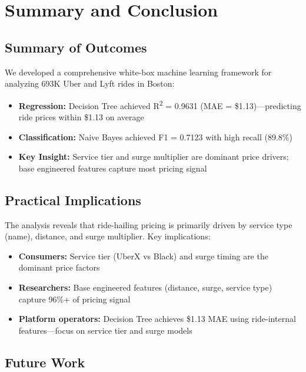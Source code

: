 \documentclass[12pt,a4paper]{article}
\begin{document}
\section{Summary and Conclusion}

\subsection{Summary of Outcomes}

We developed a comprehensive white-box machine learning framework for analyzing 693K Uber and Lyft rides in Boston:

\begin{itemize}
    \item \textbf{Regression:} Decision Tree achieved R\textsuperscript{2} = 0.9631 (MAE = \$1.13)---predicting ride prices within \$1.13 on average
    \item \textbf{Classification:} Naive Bayes achieved F1 = 0.7123 with high recall (89.8\%)
    \item \textbf{Key Insight:} Service tier and surge multiplier are dominant price drivers; base engineered features capture most pricing signal
\end{itemize}

\subsection{Practical Implications}

The analysis reveals that ride-hailing pricing is primarily driven by service type (name), distance, and surge multiplier. Key implications:

\begin{itemize}
    \item \textbf{Consumers:} Service tier (UberX vs Black) and surge timing are the dominant price factors
    \item \textbf{Researchers:} Base engineered features (distance, surge, service type) capture 96\%+ of pricing signal
    \item \textbf{Platform operators:} Decision Tree achieves \$1.13 MAE using ride-internal features---focus on service tier and surge models
\end{itemize}

\subsection{Future Work}
\end{document}
